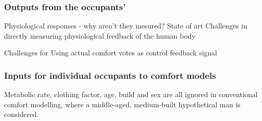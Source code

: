 \subsubsection{Outputs from the occupants'}
        Physiological responses - why aren't they mesured?
        State of art
        Challenges in directly measuring physiological feedback of the human body
        
        Challenges for Using actual comfort votes as control feedback signal
        
\subsubsection{Inputs for individual occupants to comfort models}
        Metabolic rate, clothing factor, age, build and sex are all ignored in conventional comfort modelling, where a middle-aged, medium-built hypothetical man is considered. 
